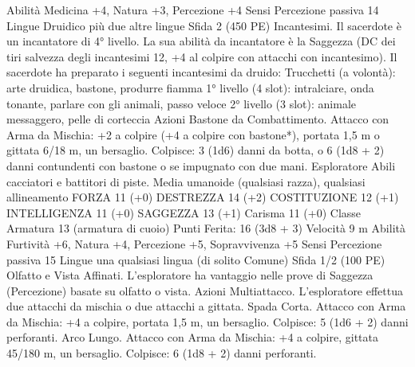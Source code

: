 \begin{multicols}{2}
Abilità Medicina +4, Natura +3, Percezione +4
Sensi Percezione passiva 14
Lingue Druidico più due altre lingue
Sfida 2 (450 PE)
Incantesimi. Il sacerdote è un incantatore di 4° livello. La sua
abilità da incantatore è la Saggezza (DC dei tiri salvezza degli
incantesimi 12, +4 al colpire con attacchi con incantesimo). Il
sacerdote ha preparato i seguenti incantesimi da druido:
Trucchetti (a volontà): arte druidica, bastone, produrre fiamma
1° livello (4 slot): intralciare, onda tonante, parlare con gli
animali, passo veloce
2° livello (3 slot): animale messaggero, pelle di corteccia
Azioni
Bastone da Combattimento. Attacco con Arma da Mischia: +2 a
colpire (+4 a colpire con bastone*), portata 1,5 m o gittata 6/18
m, un bersaglio.
Colpisce: 3 (1d6) danni da botta, o 6 (1d8 + 2) danni
contundenti con bastone o se impugnato con due mani.
Esploratore
Abili cacciatori e battitori di piste.
Media umanoide (qualsiasi razza), qualsiasi allineamento
FORZA 11 (+0)
DESTREZZA 14 (+2)
COSTITUZIONE 12 (+1)
INTELLIGENZA 11 (+0)
SAGGEZZA 13 (+1)
Carisma 11 (+0)
Classe Armatura 13 (armatura di cuoio)
\hspace*{0pt}\hfill{Punti Ferita}: 16 (3d8 + 3)
Velocità 9 m
Abilità Furtività +6, Natura +4, Percezione +5, Sopravvivenza
+5
Sensi Percezione passiva 15
Lingue una qualsiasi lingua (di solito Comune)
Sfida 1/2 (100 PE)
Olfatto e Vista Affinati. L’esploratore ha vantaggio nelle prove
di Saggezza (Percezione) basate su olfatto o vista.
Azioni
Multiattacco. L’esploratore effettua due attacchi da mischia o
due attacchi a gittata.
Spada Corta. Attacco con Arma da Mischia: +4 a colpire, portata
1,5 m, un bersaglio.
Colpisce: 5 (1d6 + 2) danni perforanti.
Arco Lungo. Attacco con Arma da Mischia: +4 a colpire, gittata
45/180 m, un bersaglio.
Colpisce: 6 (1d8 + 2) danni perforanti.
 

\end{multicols}
